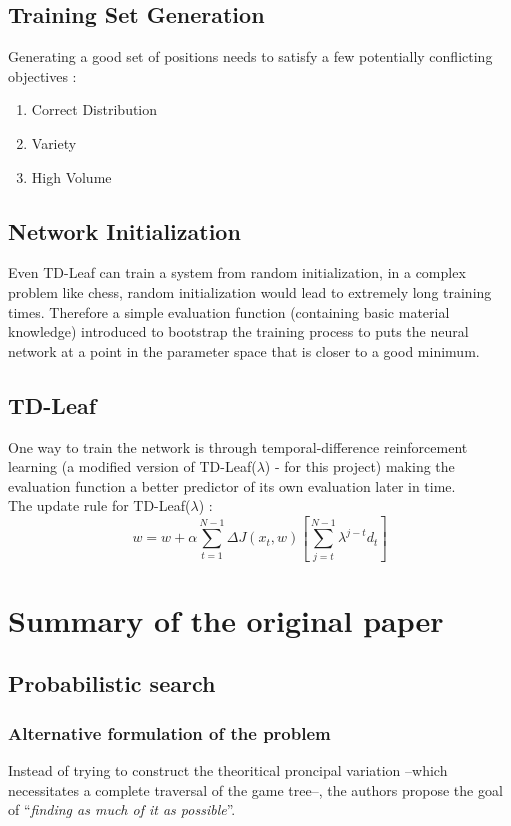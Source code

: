 \documentclass[12pt, a4paper]{report}
\begin{document}
		\section{Training Set Generation}
			Generating a good set of positions needs to satisfy a few potentially conflicting objectives : 
			\begin{enumerate}
				\item Correct Distribution
				\item Variety
				\item High Volume
			\end{enumerate}

		\section{Network Initialization}
			Even TD-Leaf can train a system from random initialization, in a complex problem like chess, random initialization would lead to extremely long training times. Therefore a simple evaluation function (containing basic material knowledge) introduced to bootstrap the
			training process to puts the neural network at a point in the parameter space that is closer to a good minimum.
		\section{TD-Leaf}
			One way to train the network is through temporal-difference reinforcement learning (a modified version of TD-Leaf($\lambda$) - for this project) making 
			the evaluation function a better predictor of its own evaluation later in time.
			\\The update rule for TD-Leaf($\lambda$) :
			$$ w = w + \alpha \sum_{t=1}^{N-1} \Delta J(x_{t} ,w) [ \sum_ {j=t}^{N-1} \lambda^{j-t} d_{t} ]$$

	\chapter{Summary of the original paper}
    	\section{Probabilistic search}
        	\subsection{Alternative formulation of the problem}
        
	            Instead of trying to construct the theoritical proncipal variation --which necessitates a complete traversal of the game tree--, the authors propose the goal of ``\emph{finding as much of it as possible}''.
\end{document}
